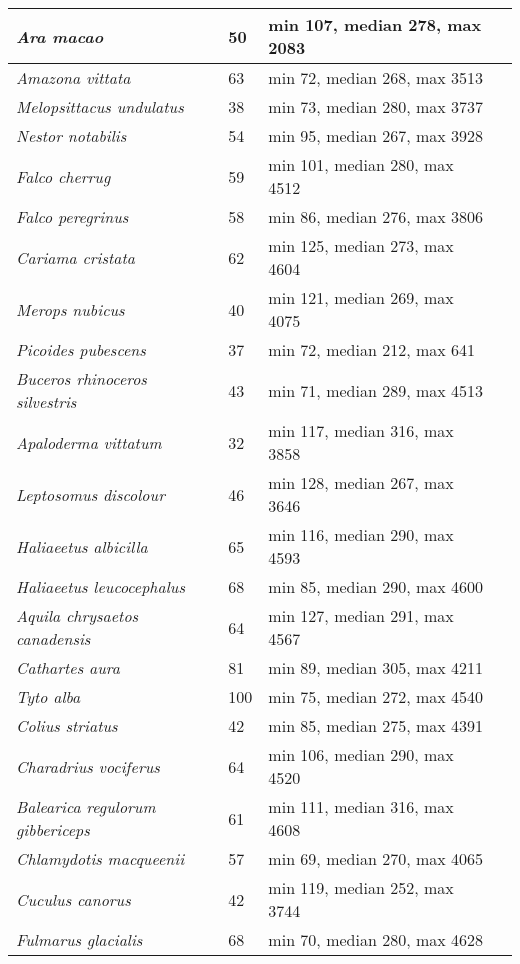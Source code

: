 {\begin{longtable}{| L{4cm} | L{2cm}  | L{5cm} | L{4cm} |}
\textit{Ara macao} & 50 & min 107, median 278, max 2083 & \\ \hline
\textit{Amazona vittata} & 63 &  min 72, median 268, max 3513 & \\ \hline
\textit{Melopsittacus undulatus} & 38 & min 73, median 280, max 3737 & \\ \hline
\textit{Nestor notabilis} & 54 & min 95, median 267, max 3928 & \\ \hline
\textit{Falco cherrug} & 59 & min 101, median 280, max 4512 & \\ \hline
\textit{Falco peregrinus} & 58 & min 86, median 276, max 3806 & \\ \hline
\textit{Cariama cristata} & 62 & min 125, median 273, max 4604 & \\ \hline
\textit{Merops nubicus} & 40 & min 121, median 269, max 4075 & \\ \hline
\textit{Picoides pubescens} & 37 & min 72, median 212, max 641 & \\ \hline
\textit{Buceros rhinoceros silvestris} & 43 & min 71, median 289, max 4513 & \\ \hline
\textit{Apaloderma vittatum} & 32 & min 117, median 316, max 3858 & \\ \hline
\textit{Leptosomus discolour} & 46 & min 128, median 267, max 3646 & \\ \hline
\textit{Haliaeetus albicilla} & 65 & min 116, median 290, max 4593 & \\ \hline
\textit{Haliaeetus leucocephalus} & 68 & min 85, median 290, max 4600 & \\ \hline
\textit{Aquila chrysaetos canadensis} & 64 & min 127, median 291, max 4567 & \\ \hline
\textit{Cathartes aura} & 81 & min 89, median 305, max 4211 & \\ \hline
\textit{Tyto alba} & 100 & min 75, median 272, max 4540 & \\ \hline
\textit{Colius striatus} & 42 & min 85, median 275, max 4391 & \\ \hline
\textit{Charadrius vociferus} & 64 & min 106, median 290, max 4520 & \\ \hline
\textit{Balearica regulorum gibbericeps} & 61 & min 111, median 316, max 4608 & \\ \hline
\textit{Chlamydotis macqueenii} & 57 & min 69, median 270, max 4065 & \\ \hline
\textit{Cuculus canorus} & 42 & min 119, median 252, max 3744 & \\ \hline
\textit{Fulmarus glacialis} & 68 & min 70, median 280, max 4628 & \\ \hline

\end{longtable}}
